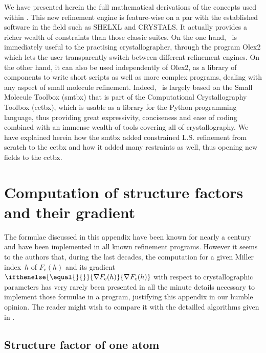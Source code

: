 \documentclass[pdf]{iucr}
\newcommand{\grad}[2][]{%
        \ifthenelse{ \equal{#1}{} } { \nabla #2 }
                                              { \nabla_{#1} {#2} }
}
\begin{document}
We have presented herein the full mathematical derivations of the concepts used within \olexrefine. This new refinement engine is feature-wise on a par with the established software in the field such as SHELXL and CRYSTALS. It actually provides a richer wealth of constraints than those classic suites. On the one hand, \olexrefine\ is immediately useful to the practising crystallographer, through the program Olex2 which lets the user transparently switch between different refinement engines. On the other hand, it can also be used independently of Olex2, as a library of components to write short scripts as well as more complex programs, dealing with any aspect of small molecule refinement. Indeed, \olexrefine\ is largely based on the Small Molecule Toolbox (smtbx) that is part of the Computational Crystallography Toolbox (cctbx), which is usable as a library for the Python programming language, thus providing great expressivity, conciseness and ease of coding combined with an immense wealth of tools covering all of crystallography. We have explained herein how the smtbx added constrained L.S. refinement from scratch to the cctbx and how it added many restraints as well, thus opening new fields to the cctbx.

\appendix

\section{Computation of structure factors and their gradient}
\label{appendix:structurefactorlinearisation}
The formulae discussed in this appendix have been known for nearly a century and have been implemented in all known refinement programs. However it seems to the authors that, during the last decades, the computation for a given Miller index~$h$ of $F_c(h)$ and its gradient $\grad{F_c(h)}$ with respect to crystallographic parameters has very rarely been presented in all the minute details necessary to implement those formulae in a program, justifying this appendix in our humble opinion. The reader might wish to compare it with the detailled algorithms given in .

\subsection{Structure factor of one atom}

\newcommand{\Fuc}{F_{\text{uc}}}
\end{document}
